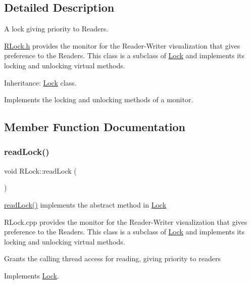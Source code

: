 \subsection{Detailed Description}
A lock giving priority to Readers. 

\hyperlink{_r_lock_8h_source}{R\+Lock.\+h} provides the monitor for the Reader-\/\+Writer visualization that gives preference to the Readers. This class is a subclass of \hyperlink{class_lock}{Lock} and implements its locking and unlocking virtual methods.

Inheritance\+: \hyperlink{class_lock}{Lock} class.

Implements the locking and unlocking methods of a monitor. 

\subsection{Member Function Documentation}
\mbox{\label{class_r_lock_a6445aacde1dc9a6f7769d1b1480d6162}} 
\subsubsection{\texorpdfstring{read\+Lock()}{readLock()}}
{\footnotesize\ttfamily void R\+Lock\+::read\+Lock (\begin{DoxyParamCaption}{ }\end{DoxyParamCaption})\hspace{0.3cm}{\ttfamily [virtual]}}



\hyperlink{class_r_lock_a6445aacde1dc9a6f7769d1b1480d6162}{read\+Lock()} implements the abstract method in \hyperlink{class_lock}{Lock} 

R\+Lock.\+cpp provides the monitor for the Reader-\/\+Writer visualization that gives preference to the Readers. This class is a subclass of \hyperlink{class_lock}{Lock} and implements its locking and unlocking virtual methods.

Grants the calling thread access for reading, giving priority to readers 

Implements \hyperlink{class_lock}{Lock}.

\mbox{\label{class_r_lock_a0af51edce04598b0afe551d356cfe05b}} 
